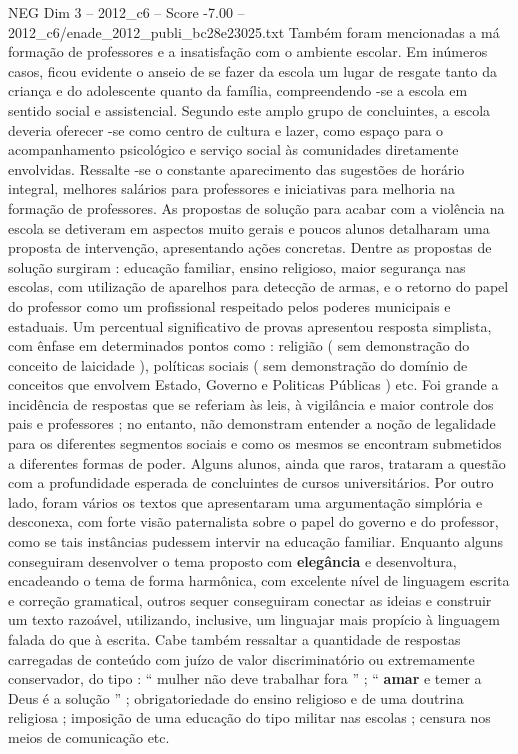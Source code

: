 \begin{textsample}{NEG Dim 3 – 2012\_c6 – Score -7.00 – 2012\_c6/enade\_2012\_publi\_bc28e23025.txt}
Também foram mencionadas a má formação de professores e a insatisfação com o ambiente escolar.
Em inúmeros casos, ficou evidente o anseio de se fazer da escola um lugar de resgate tanto da criança e do adolescente quanto da família, compreendendo -se a escola em sentido social e assistencial.
Segundo este amplo grupo de concluintes, a escola deveria oferecer -se como centro de cultura e lazer, como espaço para o acompanhamento psicológico e serviço social às comunidades diretamente envolvidas.
Ressalte -se o constante aparecimento das sugestões de horário integral, melhores salários para professores e iniciativas para melhoria na formação de professores.
As propostas de solução para acabar com a violência na escola se detiveram em aspectos muito gerais e poucos alunos detalharam uma proposta de intervenção, apresentando ações concretas.
Dentre as propostas de solução surgiram : educação familiar, ensino religioso, maior segurança nas escolas, com utilização de aparelhos para detecção de armas, e o retorno do papel do professor como um profissional respeitado pelos poderes municipais e estaduais.
Um percentual significativo de provas apresentou resposta simplista, com ênfase em determinados pontos como : religião ( sem demonstração do conceito de laicidade ), políticas sociais ( sem demonstração do domínio de conceitos que envolvem Estado, Governo e Politicas Públicas ) etc.
Foi grande a incidência de respostas que se referiam às leis, à vigilância e maior controle dos pais e professores ; no entanto, não demonstram entender a noção de legalidade para os diferentes segmentos sociais e como os mesmos se encontram submetidos a diferentes formas de poder.
Alguns alunos, ainda que raros, trataram a questão com a profundidade esperada de concluintes de cursos universitários.
Por outro lado, foram vários os textos que apresentaram uma argumentação simplória e desconexa, com forte visão paternalista sobre o papel do governo e do professor, como se tais instâncias pudessem intervir na educação familiar.
Enquanto alguns conseguiram desenvolver o tema proposto com \textbf{elegância} e desenvoltura, encadeando o tema de forma harmônica, com excelente nível de linguagem escrita e correção gramatical, outros sequer conseguiram conectar as ideias e construir um texto razoável, utilizando, inclusive, um linguajar mais propício à linguagem falada do que à escrita.
Cabe também ressaltar a quantidade de respostas carregadas de conteúdo com juízo de valor discriminatório ou extremamente conservador, do tipo : “ mulher não deve trabalhar fora ” ; “ \textbf{amar} e temer a Deus é a solução ” ; obrigatoriedade do ensino religioso e de uma doutrina religiosa ; imposição de uma educação do tipo militar nas escolas ; censura nos meios de comunicação etc.

\end{textsample}
